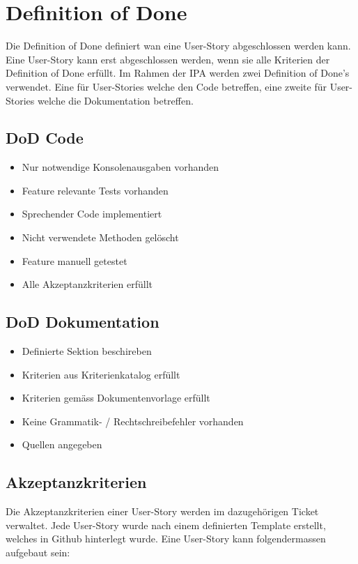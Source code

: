\section{Definition of Done}
\label{dod}
Die Definition of Done definiert wan eine User-Story abgeschlossen werden kann. Eine User-Story kann erst
abgeschlossen werden, wenn sie alle Kriterien der Definition of Done erfüllt. Im Rahmen der IPA werden zwei Definition of Done's verwendet.
Eine für User-Stories welche den Code betreffen, eine zweite für User-Stories welche die Dokumentation betreffen.

\subsection{DoD Code}

\begin{itemize}
    \item Nur notwendige Konsolenausgaben vorhanden
    \item Feature relevante Tests vorhanden
    \item Sprechender Code implementiert
    \item Nicht verwendete Methoden gelöscht
    \item Feature manuell getestet
    \item Alle Akzeptanzkriterien erfüllt
\end{itemize}

\subsection{DoD Dokumentation}

\begin{itemize}
    \item Definierte Sektion beschireben
    \item Kriterien aus Kriterienkatalog erfüllt
    \item Kriterien gemäss Dokumentenvorlage erfüllt
    \item Keine Grammatik- / Rechtschreibefehler vorhanden
    \item Quellen angegeben
\end{itemize}

\subsection{Akzeptanzkriterien}
Die Akzeptanzkriterien einer User-Story werden im dazugehörigen Ticket verwaltet. Jede User-Story wurde nach einem definierten Template
erstellt, welches in Github hinterlegt wurde. Eine User-Story kann folgendermassen aufgebaut sein:

